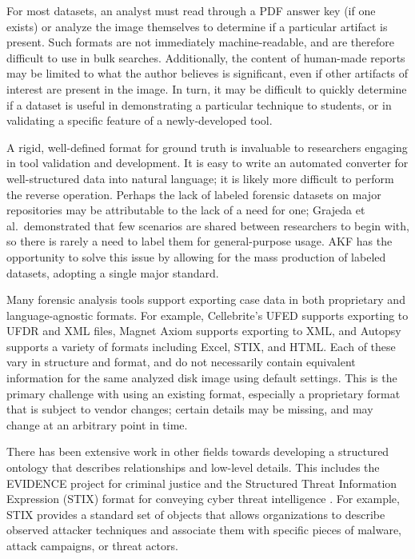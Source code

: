For most datasets, an analyst must read through a PDF answer key (if one
exists) or analyze the image themselves to determine if a particular
artifact is present. Such formats are not immediately machine-readable,
and are therefore difficult to use in bulk searches. Additionally, the
content of human-made reports may be limited to what the author believes
is significant, even if other artifacts of interest are present in the
image. In turn, it may be difficult to quickly determine if a dataset is
useful in demonstrating a particular technique to students, or in
validating a specific feature of a newly-developed tool.

A rigid, well-defined format for ground truth is invaluable to
researchers engaging in tool validation and development. It is easy to
write an automated converter for well-structured data into natural
language; it is likely more difficult to perform the reverse operation.
Perhaps the lack of labeled forensic datasets on major repositories may
be attributable to the lack of a need for one; Grajeda et
al.~demonstrated that few scenarios are shared between researchers to
begin with, so there is rarely a need to label them for general-purpose
usage. AKF has the opportunity to solve this issue by allowing for the
mass production of labeled datasets, adopting a single major standard.

Many forensic analysis tools support exporting case data in both
proprietary and language-agnostic formats. For example, Cellebrite's
UFED supports exporting to UFDR and XML files, Magnet Axiom supports
exporting to XML, and Autopsy supports a variety of formats including
Excel, STIX, and HTML. Each of these vary in structure and format, and
do not necessarily contain equivalent information for the same analyzed
disk image using default settings. This is the primary challenge with
using an existing format, especially a proprietary format that is
subject to vendor changes; certain details may be missing, and may
change at an arbitrary point in time.

There has been extensive work in other fields towards developing a
structured ontology that describes relationships and low-level details.
This includes the EVIDENCE project for criminal justice and the
Structured Threat Information Expression (STIX) format for conveying
cyber threat intelligence
\cite{caseyLeveragingCybOXStandardize2015}. For example, STIX
provides a standard set of objects that allows organizations to describe
observed attacker techniques and associate them with specific pieces of
malware, attack campaigns, or threat actors.

